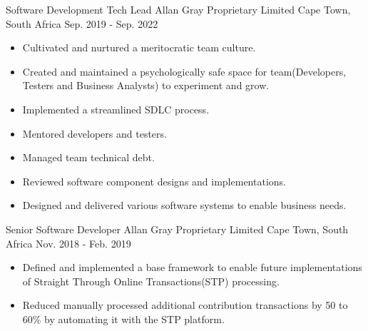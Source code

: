 \begin{cventries}
  \cventry
    {Software Development Tech Lead} %
    {Allan Gray Proprietary Limited} %
    {Cape Town, South Africa} %
    {Sep. 2019 - Sep. 2022} %
    {
      \begin{cvitems} %
        \begin{itemize}
          \item {Cultivated and nurtured a meritocratic team culture.}
          \item {Created and maintained a psychologically safe space for team(Developers, Testers and Business Analysts) to experiment and grow.}
          \item {Implemented a streamlined SDLC process.}
          \item {Mentored developers and testers.}
          \item {Managed team technical debt.}
          \item {Reviewed software component designs and implementations.}
          \item {Designed and delivered various software systems to enable business needs.}
        \end{itemize}
      \end{cvitems}
    }
  \cventry
    {Senior Software Developer} %
    {Allan Gray Proprietary Limited} %
    {Cape Town, South Africa} %
    {Nov. 2018 - Feb. 2019} %
    {
      \begin{cvitems} %
        \begin{itemize}
          \item {Defined and implemented a base framework to enable future implementations of Straight Through Online Transactions(STP) processing.}
          \item {Reduced manually processed additional contribution transactions by 50 to 60\% by automating it with the STP platform.}

\end{itemize}
\end{cvitems}}
\end{cventries}
